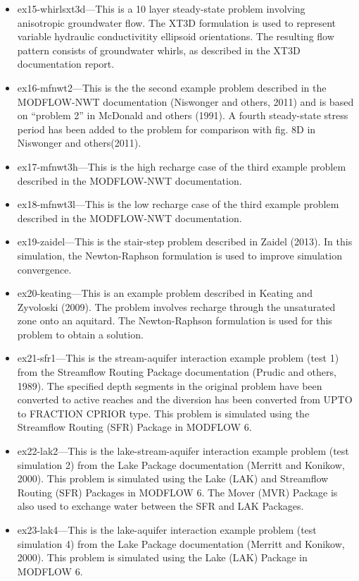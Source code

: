\begin{itemize}
\item ex15-whirlsxt3d---This is a 10 layer steady-state problem involving anisotropic groundwater flow.  The XT3D formulation is used to represent variable hydraulic conductivitity ellipsoid orientations.  The resulting flow pattern consists of groundwater whirls, as described in the XT3D documentation report.
\item ex16-mfnwt2---This is the the second example problem described in the MODFLOW-NWT documentation (Niswonger and others, 2011) and is based on ``problem 2'' in McDonald and others (1991). A fourth steady-state stress period has been added to the problem for comparison with fig. 8D in Niswonger and others(2011).
\item ex17-mfnwt3h---This is the high recharge case of the third example problem described in the MODFLOW-NWT documentation.
\item ex18-mfnwt3l---This is the low recharge case of the third example problem described in the MODFLOW-NWT documentation.
\item ex19-zaidel---This is the stair-step problem described in Zaidel (2013).  In this simulation, the Newton-Raphson formulation is used to improve simulation convergence.
\item ex20-keating---This is an example problem described in Keating and Zyvoloski (2009).  The problem involves recharge through the unsaturated zone onto an aquitard.  The Newton-Raphson formulation is used for this problem to obtain a solution.
\item ex21-sfr1---This is the stream-aquifer interaction example problem (test 1) from the Streamflow Routing Package documentation (Prudic and others, 1989).  The specified depth segments in the original problem have been converted to active reaches and the diversion has been converted from UPTO to FRACTION CPRIOR type. This problem is simulated using the Streamflow Routing (SFR) Package in MODFLOW 6.
\item ex22-lak2---This is the lake-stream-aquifer interaction example problem (test simulation 2) from the Lake Package documentation (Merritt and Konikow, 2000).  This problem is simulated using the Lake (LAK) and Streamflow Routing (SFR) Packages in MODFLOW 6. The Mover (MVR) Package is also used to exchange water between the SFR and LAK Packages.
\item ex23-lak4---This is the lake-aquifer interaction example problem (test simulation 4) from the Lake Package documentation (Merritt and Konikow, 2000).  This problem is simulated using the Lake (LAK) Package in MODFLOW 6.

\end{itemize}
